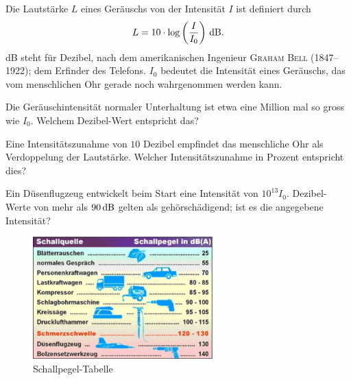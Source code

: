 \documentclass[%
11pt,%
twoside,%
titlepage,%
german,%
headsepline%
]{scrartcl}
\begin{document}
\begin{ueb}[Dezibel]\label{dezibel}
  Die Lautstärke $L$ eines Geräuschs von der Intensität $I$ ist
  definiert durch $$L=\unit[10\cdot\log\left(\frac{I}{I_0}\right)]{dB}.$$
  \unit{dB}
  steht für Dezibel, nach dem amerikanischen Ingenieur \textsc{Graham Bell}
  (1847--1922); dem Erfinder des Telefons. $I_0$ bedeutet die Intensität
  eines Geräuschs, das vom menschlichen Ohr gerade noch wahrgenommen
  werden kann.
  \begin{enumeratea}
    \item Die Geräuschintensität normaler Unterhaltung ist etwa eine
    Million mal so gross wie $I_0$. Welchem Dezibel-Wert entspricht
    das?
    \item Eine Intensitätszunahme von $10$ Dezibel empfindet das
    menschliche Ohr als Verdoppelung der Lautstärke. Welcher
    Intensitätszunahme in Prozent entspricht dies?
    \item Ein Düsenflugzeug entwickelt beim Start eine Intensität
    von $10^{13}I_0$. Dezibel-Werte von mehr als $\unit[90]{dB}$
    gelten als gehörschädigend; ist es die angegebene Intensität?
  \end{enumeratea}
\end{ueb}
\begin{figure}
\centering
    \includegraphics[width=0.618\textwidth]{pictures/dbtabelle}
    \caption{Schallpegel-Tabelle}
 \end{figure}
\end{document}
